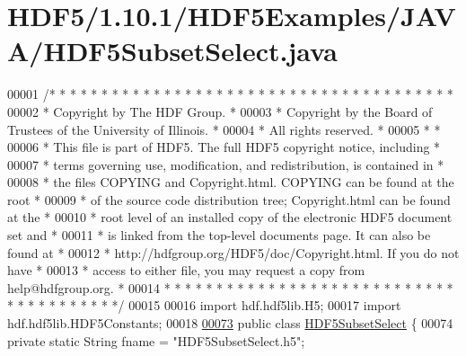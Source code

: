 \hypertarget{_h_d_f5_21_810_81_2_h_d_f5_examples_2_j_a_v_a_2_h_d_f5_subset_select_8java_source}{}\section{H\+D\+F5/1.10.1/\+H\+D\+F5\+Examples/\+J\+A\+V\+A/\+H\+D\+F5\+Subset\+Select.java}
\label{_h_d_f5_21_810_81_2_h_d_f5_examples_2_j_a_v_a_2_h_d_f5_subset_select_8java_source}

\begin{DoxyCode}
00001 \textcolor{comment}{/* * * * * * * * * * * * * * * * * * * * * * * * * * * * * * * * * * * * * * *}
00002 \textcolor{comment}{ * Copyright by The HDF Group.                                               *}
00003 \textcolor{comment}{ * Copyright by the Board of Trustees of the University of Illinois.         *}
00004 \textcolor{comment}{ * All rights reserved.                                                      *}
00005 \textcolor{comment}{ *                                                                           *}
00006 \textcolor{comment}{ * This file is part of HDF5.  The full HDF5 copyright notice, including     *}
00007 \textcolor{comment}{ * terms governing use, modification, and redistribution, is contained in    *}
00008 \textcolor{comment}{ * the files COPYING and Copyright.html.  COPYING can be found at the root   *}
00009 \textcolor{comment}{ * of the source code distribution tree; Copyright.html can be found at the  *}
00010 \textcolor{comment}{ * root level of an installed copy of the electronic HDF5 document set and   *}
00011 \textcolor{comment}{ * is linked from the top-level documents page.  It can also be found at     *}
00012 \textcolor{comment}{ * http://hdfgroup.org/HDF5/doc/Copyright.html.  If you do not have          *}
00013 \textcolor{comment}{ * access to either file, you may request a copy from help@hdfgroup.org.     *}
00014 \textcolor{comment}{ * * * * * * * * * * * * * * * * * * * * * * * * * * * * * * * * * * * * * * */}
00015 
00016 \textcolor{keyword}{import} hdf.hdf5lib.H5;
00017 \textcolor{keyword}{import} hdf.hdf5lib.HDF5Constants;
00018 
\hyperlink{class_h_d_f5_subset_select}{00073} \textcolor{keyword}{public} \textcolor{keyword}{class }\hyperlink{class_h_d_f5_subset_select}{HDF5SubsetSelect} \{
00074     \textcolor{keyword}{private} \textcolor{keyword}{static} String fname  = \textcolor{stringliteral}{"HDF5SubsetSelect.h5"};

\end{DoxyCode}
